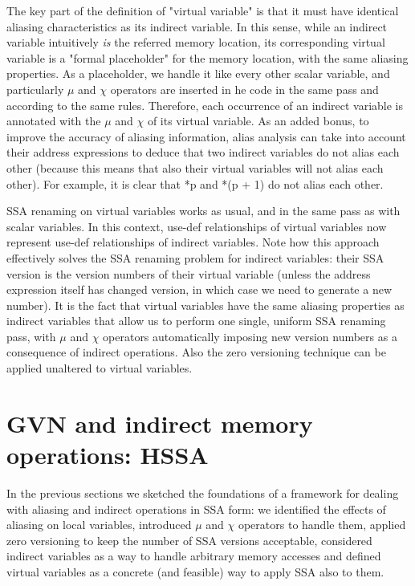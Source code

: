 The key part of the definition of "virtual variable" is that it must have identical aliasing characteristics as its indirect variable.
In this sense, while an indirect variable intuitively {\em is} the referred memory location, its corresponding virtual variable is a "formal placeholder" for the memory location, with the same aliasing properties.
As a placeholder, we handle it like every other scalar variable, and particularly $\mu$ and $\chi$ operators are inserted in he code in the same pass and according to the same rules.
Therefore, each occurrence of an indirect variable is annotated with the $\mu$ and $\chi$ of its virtual variable.
As an added bonus, to improve the accuracy of aliasing information, alias analysis can take into account their address expressions to deduce that two indirect variables do not alias each other (because this means that also their virtual variables will not alias each other).
For example, it is clear that *p and *(p + 1) do not alias each other.

SSA renaming on virtual variables works as usual, and in the same pass as with scalar variables.
In this context, use-def relationships of virtual variables now represent use-def relationships of indirect variables.
Note how this approach effectively solves the SSA renaming problem for indirect variables: their SSA version is the version numbers of their virtual variable (unless the address expression itself has changed version, in which case we need to generate a new number).
It is the fact that virtual variables have the same aliasing properties as indirect variables that allow us to perform one single, uniform SSA renaming pass, with $\mu$ and $\chi$ operators automatically imposing new version numbers as a consequence of indirect operations.
Also the zero versioning technique can be applied unaltered to virtual variables.


\section{GVN and indirect memory operations: HSSA}


In the previous sections we sketched the foundations of a framework for dealing with aliasing and indirect operations in SSA form: we identified the effects of aliasing on local variables, introduced $\mu$ and $\chi$ operators to handle them, applied zero versioning to keep the number of SSA versions acceptable, considered indirect variables as a way to handle arbitrary memory accesses and defined virtual variables as a concrete (and feasible) way to apply SSA also to them.

